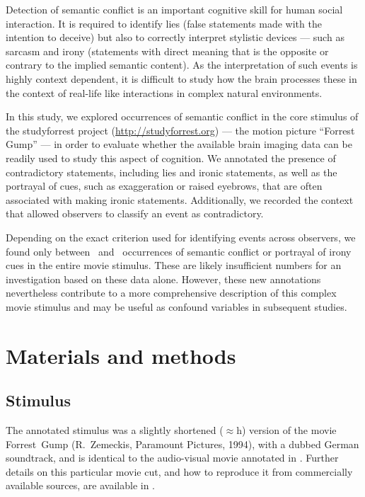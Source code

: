 \documentclass[10pt,a4paper]{article}
\begin{document}
Detection of semantic conflict is an important cognitive skill for human social
interaction. It is required to identify lies (false statements made with the
intention to deceive) but also to correctly interpret stylistic devices — such
as sarcasm and irony (statements with direct meaning that is the opposite
\citep{AEH+03} or contrary \citep{Han2004} to the implied semantic content). As
the interpretation of such events is highly context dependent, it is difficult
to study how the brain processes these in the context of real-life like
interactions in complex natural environments.

In this study, we explored occurrences of semantic conflict in the core stimulus
of the studyforrest project (\url{http://studyforrest.org}) — the motion picture
``Forrest Gump'' — in order to evaluate whether the available brain imaging data
\citep{HBI+14,HAK+16} can be readily used to study this aspect of cognition.
We annotated the presence of contradictory statements, including lies and
ironic statements, as well as the portrayal of cues, such as exaggeration or
raised eyebrows, that are often associated with making ironic statements.
Additionally, we recorded the context that allowed observers to classify an
event as contradictory.

Depending on the exact criterion used for identifying events across observers,
we found only between \AggTwentyNEvents\ and \AggHundredNEvents\ occurrences of
semantic conflict or portrayal of irony cues in the entire movie stimulus.
These are likely insufficient numbers for an investigation based on these data
alone. However, these new annotations nevertheless contribute to a more
comprehensive description of this complex movie stimulus
\citep{LRS+2015,HH2016} and may be useful as confound variables in subsequent
studies.


\section*{Materials and methods}

\subsection*{Stimulus}

The annotated stimulus was a slightly shortened ($\approx$\unit[2]{h}) version
of the movie Forrest~Gump (R.~Zemeckis, Paramount Pictures, 1994), with a dubbed
German soundtrack, and is identical to the audio-visual movie annotated in
\cite{LRS+2015,HH2016}. Further details on this particular movie cut, and how
to reproduce it from commercially available sources, are available in
\cite{HAK+16}.
\end{document}
